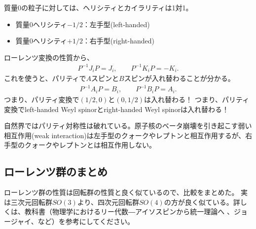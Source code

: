 \documentclass[10pt,a4paper]{jarticle}
\begin{document}
質量0の粒子に対しては、ヘリシティとカイラリティは1対1。
\begin{itemize}
\item 質量0ヘリシティ$-1/2$：左手型(left-handed)
\item 質量0ヘリシティ$+1/2$：右手型(right-handed)
\end{itemize}


ローレンツ変換の性質から、
\begin{align}
P^{-1} J_i P = J_i, \qquad
P^{-1} K_i P = -K_i.
\end{align}
%
これを使うと、パリティで$A$スピンと$B$スピンが入れ替わることが分かる。
\begin{align}
P^{-1} A_i P = B_i, \qquad
P^{-1} B_i P = A_i.
\end{align}
%
つまり、パリティ変換で$(1/2,0)$と$(0,1/2)$は入れ替わる！
つまり、パリティ変換でleft-handed Weyl spinorとright-handed Weyl spinorは入れ替わる！

自然界ではパリティ対称性は破れている。原子核のベータ崩壊を引き起こす弱い相互作用(weak interaction)は左手型のクォークやレプトンと相互作用するが、右手型のクォークやレプトンとは相互作用しない。


\subsection{ローレンツ群のまとめ}
ローレンツ群の性質は回転群の性質と良く似ているので、比較をまとめた。
実は三次元回転群$SO(3)$より、四次元回転群$SO(4)$の方が良く似ている。詳しくは、教科書（物理学におけるリー代数―アイソスピンから統一理論へ 、ジョージャイ、など）を参考にしてください。
\end{document}

